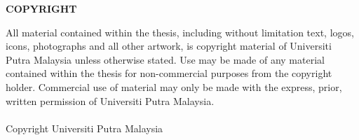 \singlespacing
\begin{center}
{\normalsize \bf COPYRIGHT}
\end{center}
All material contained within the thesis, including without limitation text, logos, icons, photographs and all other artwork, is copyright material of Universiti Putra Malaysia unless otherwise stated. Use may be made of any material contained within the thesis for non-commercial purposes from the copyright holder. Commercial use of material may only be made with the express, prior, written permission of Universiti Putra Malaysia.\\\\
Copyright \textcopyright Universiti Putra Malaysia